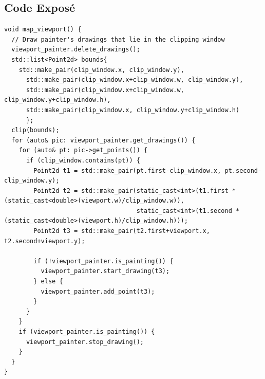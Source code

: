 \documentclass{article}
\begin{document}
\subsection{Code Exposé}
\label{sec:orgheadline9}
\begin{verbatim}
void map_viewport() {
  // Draw painter's drawings that lie in the clipping window
  viewport_painter.delete_drawings();
  std::list<Point2d> bounds{
    std::make_pair(clip_window.x, clip_window.y),
      std::make_pair(clip_window.x+clip_window.w, clip_window.y),
      std::make_pair(clip_window.x+clip_window.w, clip_window.y+clip_window.h),
      std::make_pair(clip_window.x, clip_window.y+clip_window.h)
      };
  clip(bounds);
  for (auto& pic: viewport_painter.get_drawings()) {
    for (auto& pt: pic->get_points()) {
      if (clip_window.contains(pt)) {
        Point2d t1 = std::make_pair(pt.first-clip_window.x, pt.second-clip_window.y);
        Point2d t2 = std::make_pair(static_cast<int>(t1.first * (static_cast<double>(viewport.w)/clip_window.w)),
                                    static_cast<int>(t1.second * (static_cast<double>(viewport.h)/clip_window.h)));
        Point2d t3 = std::make_pair(t2.first+viewport.x, t2.second+viewport.y);

        if (!viewport_painter.is_painting()) {
          viewport_painter.start_drawing(t3);
        } else {
          viewport_painter.add_point(t3);
        }
      }
    }
    if (viewport_painter.is_painting()) {
      viewport_painter.stop_drawing();
    }
  }
}
\end{verbatim}
\end{document}
